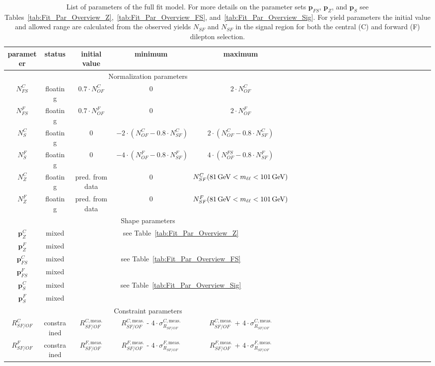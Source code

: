 \begin{table}[htbp]
\begin{center}
 \renewcommand{\arraystretch}{1.3}
 \caption{List of parameters of the full fit model. For more details on the parameter sets $\mathbf{p}_{FS}$, $\mathbf{p}_{Z}$, and $\mathbf{p}_{S}$ see Tables~\ref{tab:Fit_Par_Overview_Z},~\ref{tab:Fit_Par_Overview_FS}, and~\ref{tab:Fit_Par_Overview_Sig}. For yield parameters the initial value and allowed range are calculated from the observed yields $N_{SF}$ and $N_{SF}$ in the signal region for both the central (C) and forward (F) dilepton selection.\label{tab:Fit_Par_Overview_Full}}
\begin{tabular}{c|c|c|c|ccccccccccccccccccccc}
parameter & status & initial value & minimum & maximum \\ \hline
\multicolumn{5}{c}{Normalization parameters}\\ \hline
$N_{FS}^{C}$ & floating & $0.7\cdot N_{OF}^{C}$ & 0 & $2\cdot N_{OF}^{C}$ \\
$N_{FS}^{F}$ & floating & $0.7\cdot N_{OF}^{F}$ & 0 & $2\cdot N_{OF}^{F}$ \\
$N_{S}^{C}$ & floating & 0 &  $-2\cdot(N_{OF}^{C}-0.8\cdot N_{SF}^{C})$ &  $2\cdot(N_{OF}^{C}-0.8\cdot N_{SF}^{C})$ \\
$N_{S}^{F}$ & floating & 0 &  $-4\cdot(N_{OF}^{F}-0.8\cdot N_{SF}^{F})$ &  $4\cdot(N_{OF}^{FS}-0.8\cdot N_{SF}^{F})$ \\
$N_{Z}^{C}$ & floating & pred. from data & 0 & $N_{SF}^{C}(81\,\text{Ge\hspace{-.08em}V} < m_{\ell\ell} < 101\,\text{Ge\hspace{-.08em}V})$ \\
$N_{Z}^{F}$ & floating & pred. from data & 0 & $N_{SF}^{F}(81\,\text{Ge\hspace{-.08em}V} < m_{\ell\ell} < 101\,\text{Ge\hspace{-.08em}V})$ \\ \hline
\multicolumn{5}{c}{Shape parameters} \\ \hline
$\mathbf{p}_{Z}^{C}$ & mixed & \multicolumn{3}{c}{\multirow{2}{*}{see Table~\ref{tab:Fit_Par_Overview_Z}}}\\
$\mathbf{p}_{Z}^{F}$ & mixed & \multicolumn{3}{c}{}\\
$\mathbf{p}_{FS}^{C}$ & mixed & \multicolumn{3}{c}{\multirow{2}{*}{see Table~\ref{tab:Fit_Par_Overview_FS}}}\\
$\mathbf{p}_{FS}^{F}$ & mixed & \multicolumn{3}{c}{}\\
$\mathbf{p}_{S}^{C}$ & mixed & \multicolumn{3}{c}{\multirow{2}{*}{see Table~\ref{tab:Fit_Par_Overview_Sig}}}\\
$\mathbf{p}_{S}^{F}$ & mixed & \multicolumn{3}{c}{}\\ \hline
\multicolumn{5}{c}{Constraint parameters}\\ \hline
$R_{SF/OF}^{C}$ & constrained & $R_{SF/OF}^{C,\text{meas.}}$  & $R_{SF/OF}^{C,\text{meas.}}$ - $4\cdot \sigma_{R_{SF/OF}}^{C,\text{meas.}}$ & $R_{SF/OF}^{C,\text{meas.}}$ + $4\cdot \sigma_{R_{SF/OF}}^{C,\text{meas.}}$ \\
$R_{SF/OF}^{F}$ & constrained & $R_{SF/OF}^{F,\text{meas.}}$  & $R_{SF/OF}^{F,\text{meas.}}$ - $4\cdot \sigma_{R_{SF/OF}}^{F,\text{meas.}}$ & $R_{SF/OF}^{F,\text{meas.}}$ + $4\cdot \sigma_{R_{SF/OF}}^{F,\text{meas.}}$ \\
\end{tabular}


\end{center}
\end{table}
